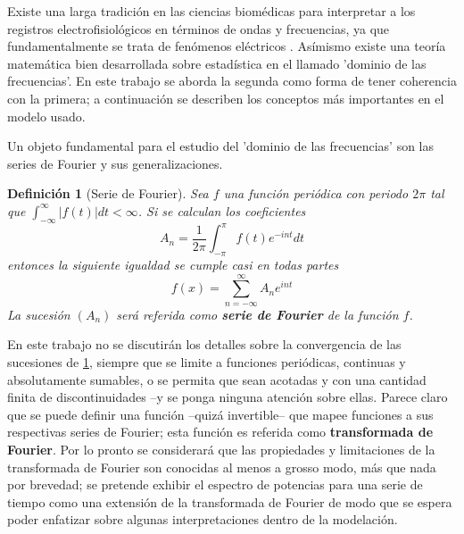 \documentclass[12pt,a4paper]{mitthesis}
\newtheorem{defn}{Definici\'on}
\newcommand{\intR}{\int_{-\infty}^{\infty}}
\newcommand{\intPI}{\int_{-\pi}^{\pi}}
\newcommand{\abso}[1]{\left| #1 \right|}
\begin{document}
Existe una larga tradici\'on en las ciencias biom\'edicas para interpretar a los registros
electrofisiol\'ogicos en t\'erminos de ondas y frecuencias, ya que fundamentalmente se trata de 
fen\'omenos el\'ectricos \cite{Kaiser00}. As\'imismo existe una teor\'ia matem\'atica bien 
desarrollada sobre estad\'istica en el llamado 'dominio de las frecuencias'. 
En este trabajo se aborda la segunda como forma de tener coherencia con la primera; a 
continuaci\'on se describen los conceptos m\'as importantes en el modelo usado.

Un objeto fundamental para el estudio del 'dominio de las frecuencias'
son las series de Fourier y sus generalizaciones. 

\begin{defn}[Serie de Fourier]
Sea $f$ una funci\'on peri\'odica con periodo $2\pi$ tal que $\intR \abso{f(t)} dt < \infty$. Si se 
calculan los coeficientes
\begin{equation*}
A_n = \frac{1}{2\pi} \intPI f(t) e^{- i n t} dt
\end{equation*}
entonces la siguiente igualdad se cumple casi en todas partes
\begin{equation*}
f(x) = \sum_{n=-\infty}^{\infty} A_n e^{i n t}
\end{equation*}
La sucesi\'on $\left( A_n \right)$ ser\'a referida como \textbf{serie de Fourier} de la funci\'on
$f$.
\label{FourierClasico}
\end{defn}

En este trabajo no se discutir\'an los detalles sobre la convergencia de las sucesiones de 
\ref{FourierClasico}, siempre que se limite a funciones peri\'odicas, continuas y absolutamente 
sumables, o se permita que sean acotadas y con una cantidad finita de discontinuidades --y se ponga 
ninguna atenci\'on sobre ellas.
Parece claro que se puede definir una funci\'on --quiz\'a invertible-- que mapee funciones a sus 
respectivas series de Fourier; esta funci\'on es referida como \textbf{transformada de Fourier}. 
Por lo pronto se considerar\'a que las propiedades y limitaciones de la transformada de Fourier son 
conocidas al menos a grosso modo, m\'as que nada por brevedad; se pretende exhibir el espectro de 
potencias para una serie de tiempo como una extensi\'on de la transformada de Fourier de modo que 
se espera poder enfatizar sobre algunas interpretaciones dentro de la modelaci\'on.
\end{document}
